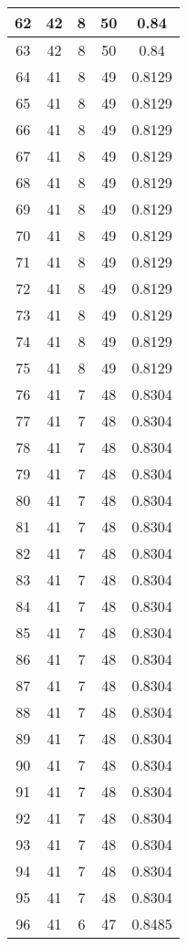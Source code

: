 \documentclass[letterpaper, 12pt]{article}
\begin{document}
\begin{longtable}{|c|c|c|c|c|}
\hline
62 & 42 & 8 & 50 & 0.84 \\
\hline
63 & 42 & 8 & 50 & 0.84 \\
\hline
64 & 41 & 8 & 49 & 0.8129 \\
\hline
65 & 41 & 8 & 49 & 0.8129 \\
\hline
66 & 41 & 8 & 49 & 0.8129 \\
\hline
67 & 41 & 8 & 49 & 0.8129 \\
\hline
68 & 41 & 8 & 49 & 0.8129 \\
\hline
69 & 41 & 8 & 49 & 0.8129 \\
\hline
70 & 41 & 8 & 49 & 0.8129 \\
\hline
71 & 41 & 8 & 49 & 0.8129 \\
\hline
72 & 41 & 8 & 49 & 0.8129 \\
\hline
73 & 41 & 8 & 49 & 0.8129 \\
\hline
74 & 41 & 8 & 49 & 0.8129 \\
\hline
75 & 41 & 8 & 49 & 0.8129 \\
\hline
76 & 41 & 7 & 48 & 0.8304 \\
\hline
77 & 41 & 7 & 48 & 0.8304 \\
\hline
78 & 41 & 7 & 48 & 0.8304 \\
\hline
79 & 41 & 7 & 48 & 0.8304 \\
\hline
80 & 41 & 7 & 48 & 0.8304 \\
\hline
81 & 41 & 7 & 48 & 0.8304 \\
\hline
82 & 41 & 7 & 48 & 0.8304 \\
\hline
83 & 41 & 7 & 48 & 0.8304 \\
\hline
84 & 41 & 7 & 48 & 0.8304 \\
\hline
85 & 41 & 7 & 48 & 0.8304 \\
\hline
86 & 41 & 7 & 48 & 0.8304 \\
\hline
87 & 41 & 7 & 48 & 0.8304 \\
\hline
88 & 41 & 7 & 48 & 0.8304 \\
\hline
89 & 41 & 7 & 48 & 0.8304 \\
\hline
90 & 41 & 7 & 48 & 0.8304 \\
\hline
91 & 41 & 7 & 48 & 0.8304 \\
\hline
92 & 41 & 7 & 48 & 0.8304 \\
\hline
93 & 41 & 7 & 48 & 0.8304 \\
\hline
94 & 41 & 7 & 48 & 0.8304 \\
\hline
95 & 41 & 7 & 48 & 0.8304 \\
\hline
96 & 41 & 6 & 47 & 0.8485 \\

\end{longtable}
\end{document}
